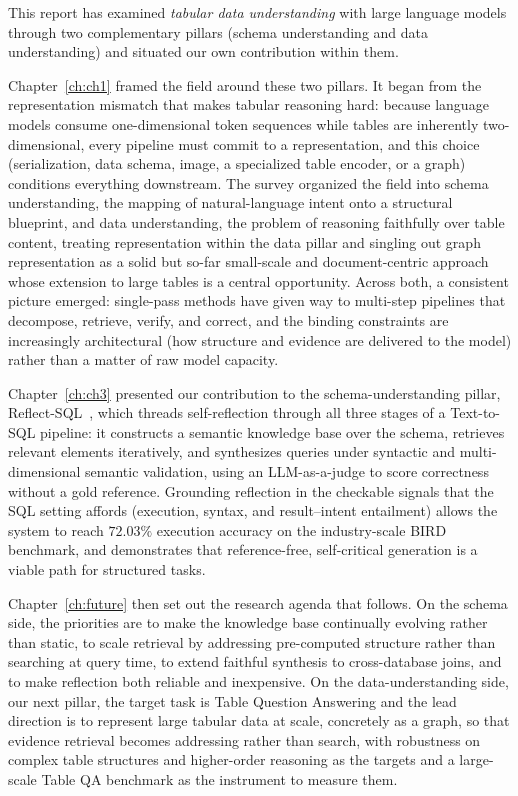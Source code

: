 This report has examined \emph{tabular data understanding} with large language models through two complementary pillars (schema understanding and data understanding) and situated our own contribution within them.

Chapter~\ref{ch:ch1} framed the field around these two pillars. It began from the representation mismatch that makes tabular reasoning hard: because language models consume one-dimensional token sequences while tables are inherently two-dimensional, every pipeline must commit to a representation, and this choice (serialization, data schema, image, a specialized table encoder, or a graph) conditions everything downstream. The survey organized the field into schema understanding, the mapping of natural-language intent onto a structural blueprint, and data understanding, the problem of reasoning faithfully over table content, treating representation within the data pillar and singling out graph representation as a solid but so-far small-scale and document-centric approach whose extension to large tables is a central opportunity. Across both, a consistent picture emerged: single-pass methods have given way to multi-step pipelines that decompose, retrieve, verify, and correct, and the binding constraints are increasingly architectural (how structure and evidence are delivered to the model) rather than a matter of raw model capacity.

Chapter~\ref{ch:ch3} presented our contribution to the schema-understanding pillar, Reflect-SQL~\cite{jain2027reflectsql}, which threads self-reflection through all three stages of a Text-to-SQL pipeline: it constructs a semantic knowledge base over the schema, retrieves relevant elements iteratively, and synthesizes queries under syntactic and multi-dimensional semantic validation, using an LLM-as-a-judge to score correctness without a gold reference. Grounding reflection in the checkable signals that the SQL setting affords (execution, syntax, and result--intent entailment) allows the system to reach $72.03\%$ execution accuracy on the industry-scale BIRD benchmark, and demonstrates that reference-free, self-critical generation is a viable path for structured tasks.

Chapter~\ref{ch:future} then set out the research agenda that follows. On the schema side, the priorities are to make the knowledge base continually evolving rather than static, to scale retrieval by addressing pre-computed structure rather than searching at query time, to extend faithful synthesis to cross-database joins, and to make reflection both reliable and inexpensive. On the data-understanding side, our next pillar, the target task is Table Question Answering and the lead direction is to represent large tabular data at scale, concretely as a graph, so that evidence retrieval becomes addressing rather than search, with robustness on complex table structures and higher-order reasoning as the targets and a large-scale Table QA benchmark as the instrument to measure them.

